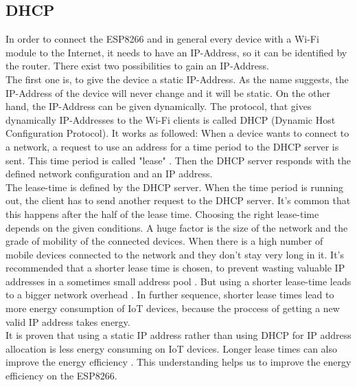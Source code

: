 \subsection{DHCP}
In order to connect the ESP8266 and in general every device with a Wi-Fi module to the Internet, it needs to have an IP-Address, so it can be identified by the router. 
There exist two possibilities to gain an IP-Address.\\ The first one is, to give the device a static IP-Address. As the name suggests, the IP-Address of the device will never change and it will be static. On the other hand, the IP-Address can be given dynamically.
The protocol, that gives dynamically IP-Addresses to the Wi-Fi clients is called DHCP (Dynamic Host Configuration Protocol).
It works as followed: When a device wants to connect to a network, a request to use an address for a time period to the DHCP server is sent. This time period is called "lease" \cite{droms1997rfc2131}. Then the DHCP server responds with the defined network configuration and an IP address.\\
The lease-time is defined by the DHCP server. When the time period is running out, the client has to send another request to the DHCP server. It's common that this happens after the half of the lease time.
Choosing the right lease-time depends on the given conditions. A huge factor is the size of the network and the grade of mobility of the connected devices. When there is a high number of mobile devices connected to the network and they don't stay very long in it. It's recommended that a shorter lease time is chosen, to prevent wasting valuable IP addresses in a sometimes small address pool \cite{khadilkar2007usage}.
But using a shorter lease-time leads to a bigger network overhead \cite{li_how_2018}. In further sequence, shorter lease times lead to more energy consumption of IoT devices, because the proccess of getting a new valid IP address takes energy.\\
It is proven that using a static IP address rather than using DHCP for IP address allocation is less energy consuming on IoT devices. Longer lease times can also improve the energy efficiency \cite{department_of_computer_engineering_mehmet_akif_ersoy_university_faculty_of_engineering_and_architecture_burdur_turkey_power_2020}. This understanding helps us to improve the energy efficiency on the ESP8266.



